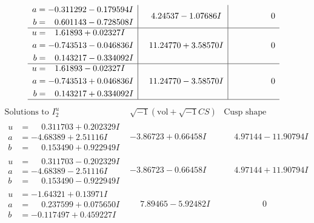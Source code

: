 \documentclass[1p]{elsarticle_modified}
\theoremstyle{definition}
\newcommand{\I}{\sqrt{-1}}
\begin{document}
$$\begin{array}{c|c|c}
\begin{aligned}
a &= -0.311292 - 0.179594 I \\
b &= \phantom{-}0.601143 - 0.728508 I\end{aligned}
 & \phantom{-}4.24537 - 1.07686 I & \phantom{-0.000000 } 0 \\ \hline\begin{aligned}
u &= \phantom{-}1.61893 + 0.02327 I \\
a &= -0.743513 - 0.046836 I \\
b &= \phantom{-}0.143217 - 0.334092 I\end{aligned}
 & \phantom{-}11.24770 + 3.58570 I & \phantom{-0.000000 } 0 \\ \hline\begin{aligned}
u &= \phantom{-}1.61893 - 0.02327 I \\
a &= -0.743513 + 0.046836 I \\
b &= \phantom{-}0.143217 + 0.334092 I\end{aligned}
 & \phantom{-}11.24770 - 3.58570 I & \phantom{-0.000000 } 0\\
 \hline 
 \end{array}$$\newpage$$\begin{array}{c|c|c}  
\text{Solutions to }I^u_{2}& \I (\text{vol} + \sqrt{-1}CS) & \text{Cusp shape}\\
 \hline 
\begin{aligned}
u &= \phantom{-}0.311703 + 0.202329 I \\
a &= -4.68389 + 2.51116 I \\
b &= \phantom{-}0.153490 + 0.922949 I\end{aligned}
 & -3.86723 + 0.66458 I & \phantom{-}4.97144 - 11.90794 I \\ \hline\begin{aligned}
u &= \phantom{-}0.311703 - 0.202329 I \\
a &= -4.68389 - 2.51116 I \\
b &= \phantom{-}0.153490 - 0.922949 I\end{aligned}
 & -3.86723 - 0.66458 I & \phantom{-}4.97144 + 11.90794 I \\ \hline\begin{aligned}
u &= -1.64321 + 0.13971 I \\
a &= \phantom{-}0.237599 + 0.075650 I \\
b &= -0.117497 + 0.459227 I\end{aligned}
 & \phantom{-}7.89465 - 5.92482 I & \phantom{-0.000000 } 0 \\ \hline\begin{aligned}

\end{aligned}
\end{array}$$
\end{document}

